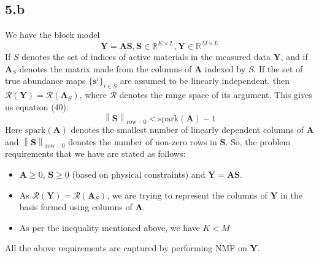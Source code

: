 \documentclass[12pt]{article}
\newcommand{\norm}[1]{\left\lVert #1 \right\rVert}
\begin{document}
\subsection*{5.b}
We have the block model
$$\boldsymbol{Y} = \boldsymbol{A}\boldsymbol{S}, \boldsymbol{S} \in \mathbb{R}^{K \times L}, \boldsymbol{Y} \in  \mathbb{R}^{M \times L}$$
If $S$ denotes the set of indices of active materials in the measured data $\boldsymbol{Y}$, and if $\boldsymbol{A}_S$ denotes the matrix made from the columns of $\boldsymbol{A}$ indexed by $S$. If the set of true abundance maps $\{\boldsymbol{s}^i\}_{i \in S}$ are assumed to be linearly independent, then $\mathcal{R}(\boldsymbol{Y}) = \mathcal{R}(\boldsymbol{A}_S)$, where $\mathcal{R}$ denotes the range space of its argument. This gives us equation (40):
$$\norm{\boldsymbol{S}}_{\text{row -- 0}} < \text{spark}(\boldsymbol{A}) - 1$$
Here $\text{spark}(\boldsymbol{A})$ denotes the smallest number of linearly dependent columns of $\boldsymbol{A}$ and $\norm{\boldsymbol{S}}_{\text{row -- 0}}$ denotes the number of non-zero rows in $\boldsymbol{S}$. So, the problem requirements that we have are stated as follows:
\begin{itemize}
	\item $\boldsymbol{A} \geq 0$, $\boldsymbol{S} \geq 0$ (based on physical constraints) and $\boldsymbol{Y} = \boldsymbol{A}\boldsymbol{S}$. 
	\item As $\mathcal{R}(\boldsymbol{Y}) = \mathcal{R}(\boldsymbol{A}_S)$, we are trying to represent the columns of $\boldsymbol{Y}$ in the basis formed using columns of $\boldsymbol{A}$.
	\item As per the inequality mentioned above, we have $K < M$
\end{itemize}
All the above requirements are captured by performing NMF on $\boldsymbol{Y}$.
\end{document}

